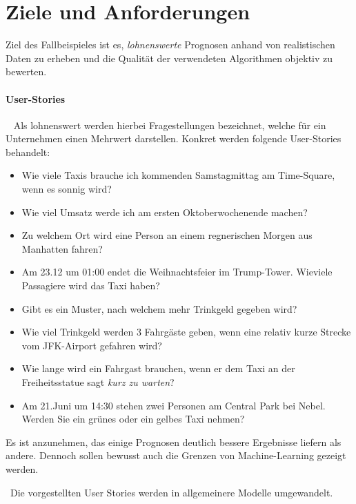 \section{Ziele und Anforderungen}
\label{sec:Fallbeispiel} \label{sec:TaxiAllgemein} \label{sec:Allgemein}
Ziel des Fallbeispieles ist es, \textit{lohnenswerte} Prognosen anhand von realistischen Daten zu erheben und die Qualität der verwendeten Algorithmen objektiv zu bewerten. 

\paragraph{User-Stories} ~\newline
Als lohnenswert werden hierbei Fragestellungen bezeichnet, welche für ein Unternehmen einen Mehrwert darstellen. Konkret werden folgende User-Stories behandelt: ~\newline

\begin{itemize}
	\item Wie viele Taxis brauche ich kommenden Samstagmittag am Time-Square, wenn es sonnig wird?
	\item Wie viel Umsatz werde ich am ersten Oktoberwochenende machen?
	\item Zu welchem Ort wird eine Person an einem regnerischen Morgen aus Manhatten fahren?
	\item Am 23.12 um 01:00 endet die Weihnachtsfeier im Trump-Tower. Wieviele Passagiere wird das Taxi haben?
	\item Gibt es ein Muster, nach welchem mehr Trinkgeld gegeben wird?
	\item Wie viel Trinkgeld werden 3 Fahrgäste geben, wenn eine relativ kurze Strecke vom JFK-Airport gefahren wird?
	\item Wie lange wird ein Fahrgast brauchen, wenn er dem Taxi an der Freiheitsstatue sagt \textit{kurz zu warten}?
	\item Am 21.Juni um 14:30 stehen zwei Personen am Central Park bei Nebel. Werden Sie ein grünes oder ein gelbes Taxi nehmen? 
\end{itemize}

Es ist anzunehmen, das einige Prognosen deutlich bessere Ergebnisse liefern als andere. Dennoch sollen bewusst auch die Grenzen von Machine-Learning gezeigt werden.

~\newline Die vorgestellten User Stories werden in allgemeinere Modelle umgewandelt.


